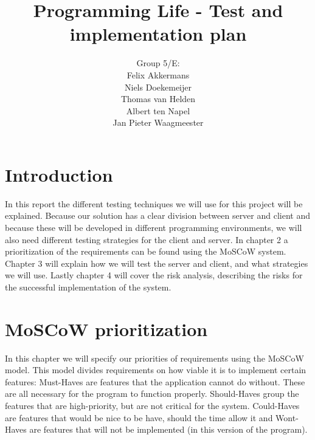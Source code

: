 \documentclass[a4paper]{article}
\title{Programming Life - Test and implementation plan }
\author{Group 5/E:\\
Felix Akkermans \\
Niels Doekemeijer \\
Thomas van Helden \\
Albert ten Napel \\
Jan Pieter Waagmeester}
\begin{document}
\maketitle

\vfill

\small{\tableofcontents}
\pagebreak

\section{Introduction}
In this report the different testing techniques we will use for this project will be explained. Because our solution has a clear division between server and client and because these will be developed in different programming environments, we will also need different testing strategies for the client and server. In chapter 2 a prioritization of the requirements can be found using the MoSCoW system. Chapter 3 will explain how we will test the server and client, and what strategies we will use. Lastly chapter 4 will cover the risk analysis, describing the risks for the successful implementation of the system.

\section{MoSCoW prioritization}
In this chapter we will specify our priorities of requirements using the MoSCoW model. This model divides requirements on how viable it is to implement certain features: Must-Haves are features that the application cannot do without. These are all necessary for the program to function properly. Should-Haves group the features that are high-priority, but are not critical for the system. Could-Haves are features that would be nice to be have, should the time allow it and Wont-Haves are features that will not be implemented (in this version of the program).
\end{document}
